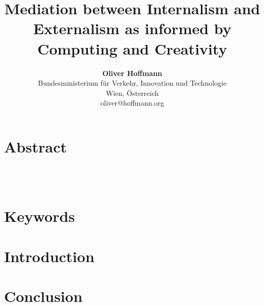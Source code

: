 \documentclass{chi-ext}
\title{Mediation between Internalism and Externalism as informed by Computing and Creativity}
\author{
  \textbf{Oliver Hoffmann} \\
  Bundesministerium für Verkehr, Innovation und Technologie \\
  Wien, Österreich \\
  oliver@hoffmann.org
}
\begin{document}
\maketitle

\begin{multicols}{2}
  
\makeauthors
\makecopyright

\section{Abstract}

\\

\\

\section{Keywords}
\makeatletter \@keywords \makeatother

\section{Introduction}

\cite{kuhn1962structure}


\section{Conclusion}





\end{multicols}
\end{document}
